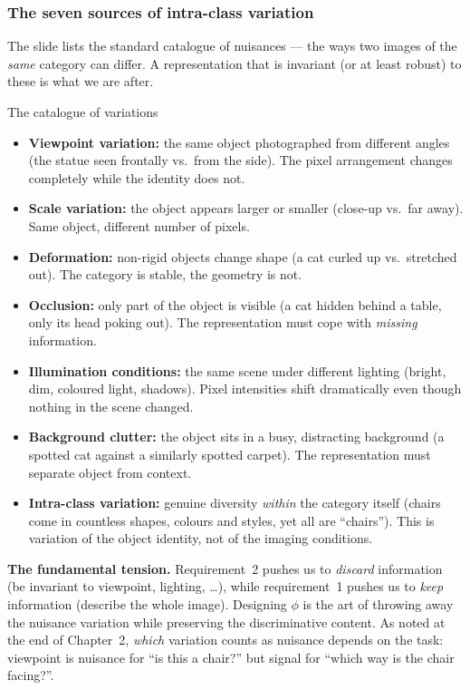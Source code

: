 \documentclass{report}
\begin{document}
\subsubsection{The seven sources of intra-class variation}

The slide lists the standard catalogue of nuisances --- the ways two images of
the \emph{same} category can differ. A representation that is invariant (or at
least robust) to these is what we are after.

\begin{defbox}{The catalogue of variations}
\begin{itemize}
\item \textbf{Viewpoint variation:} the same object photographed from
different angles (the statue seen frontally vs.\ from the side). The pixel
arrangement changes completely while the identity does not.
\item \textbf{Scale variation:} the object appears larger or smaller (close-up
vs.\ far away). Same object, different number of pixels.
\item \textbf{Deformation:} non-rigid objects change shape (a cat curled up
vs.\ stretched out). The category is stable, the geometry is not.
\item \textbf{Occlusion:} only part of the object is visible (a cat hidden
behind a table, only its head poking out). The representation must cope with
\emph{missing} information.
\item \textbf{Illumination conditions:} the same scene under different lighting
(bright, dim, coloured light, shadows). Pixel intensities shift dramatically
even though nothing in the scene changed.
\item \textbf{Background clutter:} the object sits in a busy, distracting
background (a spotted cat against a similarly spotted carpet). The
representation must separate object from context.
\item \textbf{Intra-class variation:} genuine diversity \emph{within} the
category itself (chairs come in countless shapes, colours and styles, yet all
are ``chairs''). This is variation of the object identity, not of the imaging
conditions.
\end{itemize}
\end{defbox}

\begin{keybox}
\textbf{The fundamental tension.} Requirement~2 pushes us to \emph{discard}
information (be invariant to viewpoint, lighting, \dots), while requirement~1
pushes us to \emph{keep} information (describe the whole image). Designing
$\phi$ is the art of throwing away the nuisance variation while preserving the
discriminative content. As noted at the end of Chapter~2, \emph{which}
variation counts as nuisance depends on the task: viewpoint is nuisance for
``is this a chair?'' but signal for ``which way is the chair facing?''.
\end{keybox}
\end{document}
